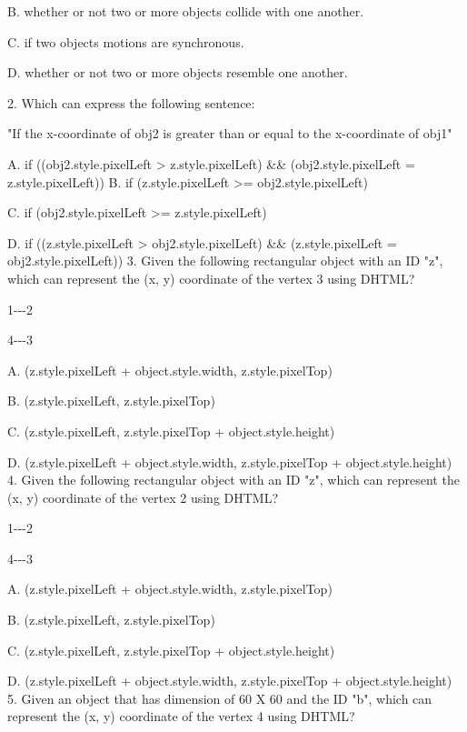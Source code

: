 \documentclass[
]{article}
\begin{document}
B. whether or not two or more objects collide with one another.

C. if two objects\textquotesingle{} motions are synchronous.

D. whether or not two or more objects resemble one another.

2. Which can express the following sentence:

"If the x-coordinate of obj2 is greater than or equal to the
x-coordinate of obj1"

A. if ((obj2.style.pixelLeft \textgreater{} z.style.pixelLeft) \&\&
(obj2.style.pixelLeft = z.style.pixelLeft)) B. if (z.style.pixelLeft
\textgreater= obj2.style.pixelLeft)

C. if (obj2.style.pixelLeft \textgreater= z.style.pixelLeft)

D. if ((z.style.pixelLeft \textgreater{} obj2.style.pixelLeft) \&\&
(z.style.pixelLeft = obj2.style.pixelLeft)) 3. Given the following
rectangular object with an ID "z", which can represent the (x, y)
coordinate of the vertex 3 using DHTML?

1-\/-\/-2

\textbar{} \textbar{}

\textbar{} \textbar{}

4-\/-\/-3

A. (z.style.pixelLeft + object.style.width, z.style.pixelTop)

B. (z.style.pixelLeft, z.style.pixelTop)

C. (z.style.pixelLeft, z.style.pixelTop + object.style.height)

D. (z.style.pixelLeft + object.style.width, z.style.pixelTop +
object.style.height) 4. Given the following rectangular object with an
ID "z", which can represent the (x, y) coordinate of the vertex 2 using
DHTML?

1-\/-\/-2

\textbar{} \textbar{}

\textbar{} \textbar{}

4-\/-\/-3

A. (z.style.pixelLeft + object.style.width, z.style.pixelTop)

B. (z.style.pixelLeft, z.style.pixelTop)

C. (z.style.pixelLeft, z.style.pixelTop + object.style.height)

D. (z.style.pixelLeft + object.style.width, z.style.pixelTop +
object.style.height) 5. Given an object that has dimension of 60 X 60
and the ID "b", which can represent the (x, y) coordinate of the vertex
4 using DHTML?
\end{document}
